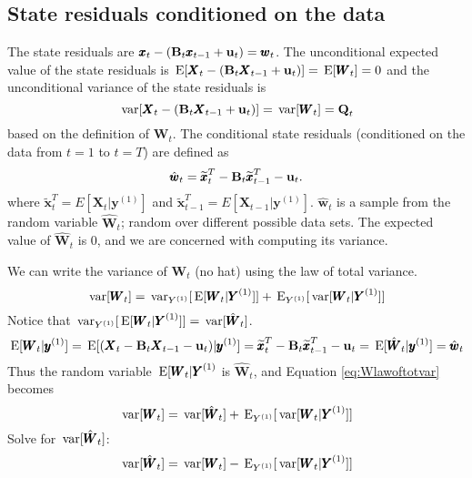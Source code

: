 \documentclass[]{article}
\def\UPS{\mbox{\boldmath $\Upsilon$}}
\def\BB{\mbox{$\mathbf B$}}	\def\bb{\mbox{$\mathbf b$}} \def\Bb{\mbox{$\mathbf J$}} \def\Ba{\mbox{$\mathbf L$}} \def\Bm{\UPS}
\def\E{\,\textup{\textrm{E}}}
\def\QQ{\mbox{$\mathbf Q$}}	 \def\qq{\mbox{$\mathbf q$}} \def\Qb{\mbox{$\mathbf G$}}  \def\Qm{\mathbb{Q}}
\def\WW{\mbox{$\pmb{W}$}}	\def\ww{\mbox{$\pmb{w}$}}
\def\XX{\mbox{$\pmb{X}$}}	\def\xx{\mbox{$\pmb{x}$}}
\def\YY{\mbox{$\pmb{Y}$}}	\def\yy{\mbox{$\pmb{y}$}}
\def\var{\,\textup{\textrm{var}}}
\def\hatxt{\widetilde{\xx}_t^T}
\def\hatxtm{\widetilde{\mbox{$\xx$}}_{t-1}^T}
\begin{document}
\subsection{State residuals conditioned on the data}

The state residuals are $\xx_t - (\BB_t \xx_{t-1} + \uu_t)=\ww_t$.  The unconditional expected value of the state residuals is $\E[\XX_t - (\BB_t \XX_{t-1} + \uu_t)] = \E[\WW_t] = 0$ and the unconditional variance of the state residuals is
\begin{equation}
\var[\XX_t - (\BB_t \XX_{t-1} + \uu_t)] = \var[\WW_t] = \QQ_t
\end{equation}
based on the definition of $\WW_t$.
The conditional state residuals (conditioned on the data from $t=1$ to $t=T$) are defined as
\begin{equation}
\hat{\ww}_t = \hatxt - \BB_t\hatxtm - \uu_t.
\end{equation}
where $\hatxt=E[\XX_t|\yy^{(1)}]$ and $\hatxtm=E[\XX_{t-1}|\yy^{(1)}]$.  $\hat{\ww}_t$ is a sample from the random variable $\hat{\WW}_t$; random over different possible data sets.  The expected value of $\hat{\WW}_t$ is 0, and we are concerned with computing its variance.

We can write the variance of $\WW_t$ (no hat) using the law of total variance.
\begin{equation}\label{eq:Wlawoftotvar}
\var[\WW_t] = \var_{Y^{(1)}}[\E[\WW_t|\YY^{(1)}]] + \E_{Y^{(1)}}[\var[\WW_t|\YY^{(1)}]]
\end{equation}
Notice that $\var_{Y^{(1)}}[\E[\WW_t|\YY^{(1)}]] = \var[\hat{\WW}_t]$.
\begin{equation}
\E[\WW_t|\yy^{(1)}] = \E[(\XX_t - \BB_t \XX_{t-1} - \uu_t)|\yy^{(1)}] =  \hatxt - \BB_t \hatxtm - \uu_t = \E[\hat{\WW}_t|\yy^{(1)}] = \hat{\ww}_t
\end{equation}
Thus the random variable $\E[\WW_t|\YY^{(1)}$ is $\hat{\WW}_t$, and Equation \ref{eq:Wlawoftotvar} becomes
\begin{equation}
\var[\WW_t] = \var[\hat{\WW}_t] + \E_{Y^{(1)}}[\var[\WW_t|\YY^{(1)}]]
\end{equation}
Solve for $\var[\hat{\WW}_t]$:
\begin{equation}\label{eqn:varwwt}
\var[\hat{\WW}_t] = \var[\WW_t] - \E_{Y^{(1)}}[\var[\WW_t|\YY^{(1)}]]
\end{equation}
\end{document}
